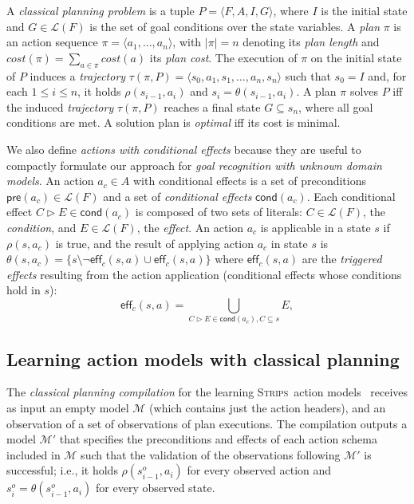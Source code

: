 \documentclass{article}
\newcommand{\tup}[1]{{\langle #1 \rangle}}
\newcommand{\pre}{\mathsf{pre}}     %
\newcommand{\eff}{\mathsf{eff}}     %
\newcommand{\cond}{\mathsf{cond}}   %
\newcommand{\strips}{\textsc{Strips}}
\begin{document}
A {\em classical planning problem} is a tuple $P=\tup{F,A,I,G}$, where $I$ is the initial state and $G\in\mathcal{L}(F)$ is the set of goal conditions over the state variables. A {\em plan} $\pi$ is an action sequence $\pi=\tup{a_1, \ldots, a_n}$, with $|\pi|=n$ denoting its {\em plan length} and $cost(\pi)=\sum_{a\in\pi} cost(a)$ its {\em plan cost}. The execution of $\pi$ on the initial state of $P$ induces a {\em trajectory} $\tau(\pi,P)=\tup{s_0, a_1, s_1, \ldots, a_n, s_n}$ such that $s_0=I$ and, for each {\small $1\leq i\leq n$}, it holds $\rho(s_{i-1},a_i)$ and $s_i=\theta(s_{i-1},a_i)$. A plan $\pi$ solves $P$ iff the induced {\em trajectory} $\tau(\pi,P)$ reaches a final state $G \subseteq s_n$, where all goal conditions are met. A solution plan is {\em optimal} iff its cost is minimal.

We also define {\em actions with conditional effects} because they are useful to compactly formulate our approach for {\em goal recognition with unknown domain models}. An action $a_c\in A$ with conditional effects is a set of preconditions $\pre(a_c)\in\mathcal{L}(F)$ and a set of {\em conditional effects} $\cond(a_c)$. Each conditional effect $C\rhd E\in\cond(a_c)$ is composed of two sets of literals: $C\in\mathcal{L}(F)$, the {\em condition}, and $E\in\mathcal{L}(F)$, the {\em effect}. An action $a_c$ is applicable in a state $s$ if $\rho(s,a_c)$ is true, and the result of applying action $a_c$ in state $s$ is $\theta(s,a_c)=\{s\setminus\neg\eff_c(s,a)\cup\eff_c(s,a)\}$ where $\eff_c(s,a)$ are the {\em triggered effects} resulting from the action application (conditional effects whose conditions hold in $s$):
\[
\eff_c(s,a)=\bigcup_{C\rhd E\in\cond(a_c),C\subseteq s} E,
\]

\subsection{Learning action models with classical planning}
The {\em classical planning compilation} for the learning \strips\ action models~\cite{aineto2018learning} receives as input an empty model $\mathcal{M}$ (which contains just the action headers), and an observation of a set of observations of plan executions. The compilation outputs a model $\mathcal{M'}$ that specifies the preconditions and effects of each action schema included in $\mathcal{M}$ such that the validation of the observations following $\mathcal{M'}$ is successful; i.e., it holds $\rho(s_{i-1}^o,a_i)$ for every observed action and $s_i^o=\theta(s_{i-1}^o,a_i)$ for every observed state.
\end{document}

